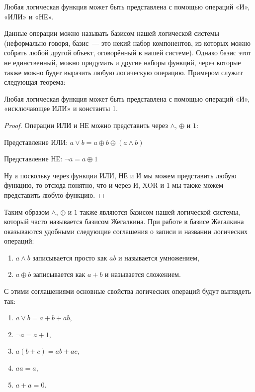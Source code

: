 \begin{thm}Любая логическая функция может быть представлена с помощью операций «И», «ИЛИ» и «НЕ».\end{thm}

Данные операции можно называть базисом нашей логической системы (неформально говоря, базис~— это некий набор компонентов, из которых можно собрать любой другой объект, оговорённый в нашей системе). Однако базис этот не единственный, можно придумать и другие наборы функций, через которые \mbox{также} можно будет выразить любую логическую операцию. Примером служит следующая теорема:

\begin{thm}Любая логическая функция может быть представлена с помощью операций «И», «исключающее ИЛИ» и константы 1.\end{thm}

\begin{proof}Операции ИЛИ и НЕ можно представить через $\land$, $\oplus$ и $1$:

Представление ИЛИ: $a\lor b = a \oplus b \oplus (a\land b)$

Представление НЕ: $\neg a = a \oplus 1$

Ну а поскольку через функции ИЛИ, НЕ и И мы можем представить любую функцию, то отсюда понятно, что и через И, XOR и 1 мы также можем представить любую функцию.\end{proof}

Таким образом $\land$, $\oplus$ и $1$ также являются базисом нашей логической системы, который часто называется базисом Жегалкина. При работе в базисе Жегалкина оказываются удобными следующие соглашения о записи и названии логических операций:

\begin{enumerate}
\item $a\land b$ записывается просто как $ab$ и называется умножением,
\item $a \oplus b$ записывается как $a + b$ и называется сложением.
\end{enumerate}

С этими соглашениями основные свойства логических операций будут выглядеть так:

\begin{enumerate}
\item $a\lor b=a + b +ab$,
\item $\neg a = a + 1$,
\item $a(b+c) = ab + ac$,
\item $aa = a$,
\item $a + a = 0$.
\end{enumerate}

